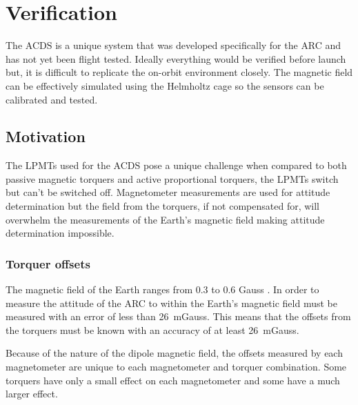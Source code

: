 
\chapter{Verification}

\label{ch:Verification}

The \ac{ACDS} is a unique system that was developed specifically for the \ac{ARC} and has not yet been flight tested. Ideally everything would be verified before launch but, it is difficult to replicate the on-orbit environment closely. The magnetic field can be effectively simulated using the Helmholtz cage so the sensors can be calibrated and tested. 

\section{Motivation}

The \acp{LPMT} used for the \ac{ACDS} pose a unique challenge when compared to both passive magnetic torquers and active proportional torquers, the \acp{LPMT} switch but can't be switched off. Magnetometer measurements are used for attitude determination but the field from the torquers, if not compensated for, will overwhelm the measurements of the Earth's magnetic field making attitude determination impossible.

\subsection{Torquer offsets}





The magnetic field of the Earth ranges from 0.3 to 0.6 Gauss \cite[pp.~114]{Wertz}. In order to measure the attitude of the \ac{ARC} to within {\textdegree} the Earth's magnetic field must be measured with an error of less than 26~mGauss. This means that the offsets from the torquers must be known with an accuracy of at least 26~mGauss.

Because of the nature of the dipole magnetic field, the offsets measured by each magnetometer are unique to each magnetometer and torquer combination. Some torquers have only a small effect on each magnetometer and some have a much larger effect. 

